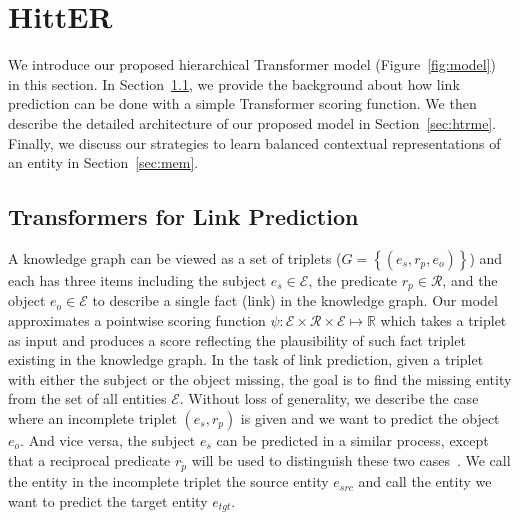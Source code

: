 \documentclass[11pt]{article}
\newcommand{\hit}{HittER\xspace}
\begin{document}
%
 \section{\hit}
\label{sec:methodology}

We introduce our proposed hierarchical Transformer model (Figure~\ref{fig:model}) in this section. In Section~\ref{sec:link_pred}, we provide the background about how link prediction can be done with a simple Transformer scoring function. We then describe the detailed architecture of our proposed model in Section~\ref{sec:htrme}. Finally, we discuss our strategies to learn balanced contextual representations of an entity in Section~\ref{sec:mem}.

\subsection{Transformers for Link Prediction}
\label{sec:link_pred}

A knowledge graph can be viewed as a set of triplets ($G=\left\{(e_s, r_p, e_o)\right\}$) and each has three items including the subject $e_s\in\mathcal{E}$, the predicate $r_p\in\mathcal{R}$, and the object $e_o\in\mathcal{E}$ to describe a single fact (link) in the knowledge graph. Our model approximates a pointwise scoring function $\psi: \mathcal{E} \times \mathcal{R} \times \mathcal{E} \mapsto \mathbb{R}$ which takes a triplet as input and produces a score reflecting the plausibility of such fact triplet existing in the knowledge graph.
In the task of link prediction, given a triplet with either the subject or the object missing, the goal is to find the missing entity from the set of all entities $\mathcal{E}$.
Without loss of generality, we describe the case where an incomplete triplet $(e_s, r_p)$ is given and we want to predict the object $e_o$.
And vice versa, the subject $e_s$ can be predicted in a similar process, except that a reciprocal predicate $r_{\tilde p}$ will be used to distinguish these two cases~\cite{lacroix2018canonical}.
We call the entity in the incomplete triplet the source entity $e_{\mathit{src}}$ and call the entity we want to predict the target entity $e_{\mathit{tgt}}$.
\end{document}
